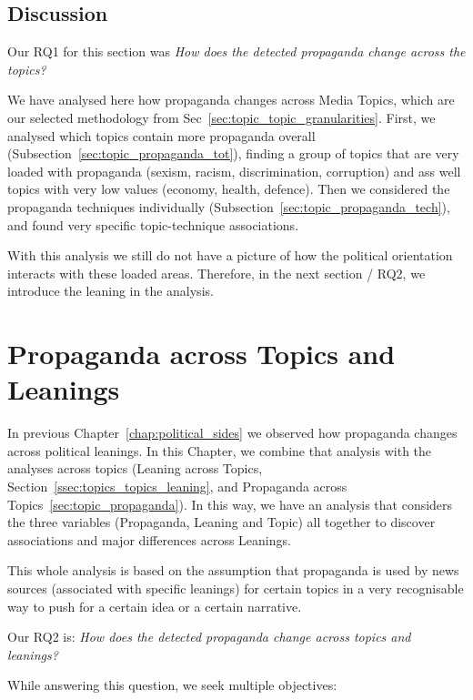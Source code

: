 \subsection{\statusgreen Discussion}

Our RQ1 for this section was \emph{How does the detected propaganda change across the topics?}

We have analysed here how propaganda changes across Media Topics, which are our selected methodology from Sec~\ref{sec:topic_topic_granularities}.
First, we analysed which topics contain more propaganda overall (Subsection~\ref{sec:topic_propaganda_tot}), finding a group of topics that are very loaded with propaganda (sexism, racism, discrimination, corruption) and ass well topics with very low values (economy, health, defence).
Then we considered the propaganda techniques individually (Subsection~\ref{sec:topic_propaganda_tech}), and found very specific topic-technique associations.

With this analysis we still do not have a picture of how the political orientation interacts with these loaded areas. Therefore, in the next section / RQ2, we introduce the leaning in the analysis.



\section{\statusorange Propaganda across Topics and Leanings}
\label{sec:topic_propaganda_leaning}

In previous Chapter~\ref{chap:political_sides} we observed how propaganda changes across political leanings.
In this Chapter, we combine that analysis with the analyses across topics (Leaning across Topics, Section~\ref{ssec:topics_topics_leaning}, and Propaganda across Topics~\ref{sec:topic_propaganda}).
In this way, we have an analysis that considers the three variables (Propaganda, Leaning and Topic) all together to discover associations and major differences across Leanings.

This whole analysis is based on the assumption that propaganda is used by news sources (associated with specific leanings) for certain topics in a very recognisable way to push for a certain idea or a certain narrative.

Our RQ2 is: \emph{How does the detected propaganda change across topics and leanings?}

While answering this question, we seek multiple objectives:

